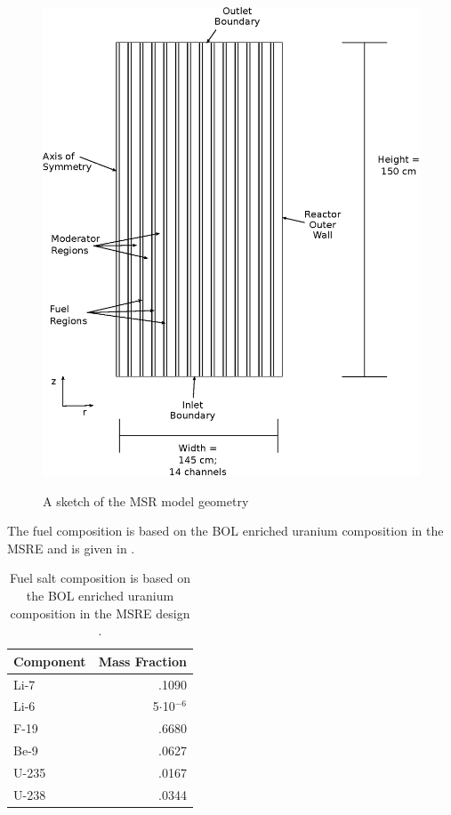 \documentclass{article}
\begin{document}
\begin{figure}[htpb]
  \centering
  \includegraphics{geometry.eps}
  \label{fig:geom}
  \caption{A sketch of the \gls{MSR} model geometry}
\end{figure}


The fuel composition is based on the \gls{BOL} enriched uranium composition in the \gls{MSRE}
and is given in  \cite{robertson_msre_1965}.


\begin{table}[htpb]
  \begin{center}
    \begin{tabular}{l | r}
      Component & Mass Fraction\\\hline\hline
      Li-7 & .1090\\
      Li-6 & 5$\cdot$10$^{-6}$\\
      F-19 & .6680\\
      Be-9 & .0627\\
      U-235 & .0167\\
      U-238 & .0344\\
    \end{tabular}
  \end{center}
        \caption{Fuel salt composition is based on the \gls{BOL} enriched
        uranium composition in the \gls{MSRE} design
        \cite{robertson_msre_1965}.}
  \label{table:comp}
\end{table}
\end{document}
